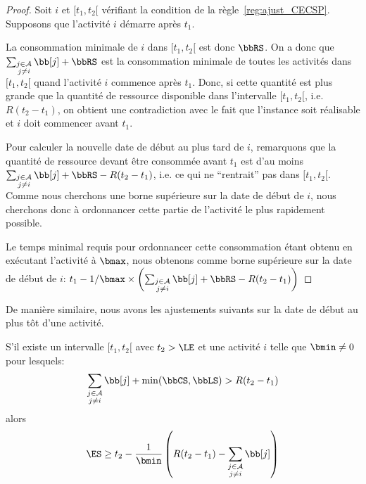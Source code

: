 \begin{proof}
  Soit $i$ et $[t_1,t_2[$ vérifiant la condition de la
  règle~\ref{reg:ajust_CECSP}. Supposons que l'activité $i$ démarre
  après   $t_1$. 

  La consommation minimale de $i$ dans $[t_1,t_2[$ est donc $\bbRS$. On
  a donc que $\sum_{\substack{j \in \A\\ j\neq i}} \bb[j] + \bbRS $ est
  la consommation minimale de toutes les activités dans $[t_1,t_2[$
  quand l'activité $i$ commence après $t_1$. Donc, si cette quantité est
  plus grande que la quantité de ressource disponible dans l'intervalle
  $[t_1,t_2[$, i.e. $R(t_2-t_1)$, on obtient une contradiction avec le
  fait que l'instance soit réalisable et $i$ doit commencer avant
  $t_1$. 

  Pour calculer la nouvelle date de début au plus tard de $i$,
  remarquons que la quantité de ressource devant être consommée avant
  $t_1$ est d'au moins $\sum_{\substack{j \in \A\\ j\neq i}} \bb[j] +
  \bbRS - R(t_2-t_1)$, i.e. ce qui ne ``rentrait'' pas dans
  $[t_1,t_2[$. Comme nous cherchons une borne supérieure sur la date de
  début de $i$, nous cherchons donc à ordonnancer cette partie de
  l'activité le plus rapidement possible. 

  Le temps minimal requis pour ordonnancer cette
  consommation étant obtenu en exécutant l'activité à $\bmax$, nous
  obtenons comme borne supérieure sur la date de début de $i$:
  $t_1 - 1/\bmax \times \left(\sum_{\substack{j \in \A\\ j\neq
        i}} \bb[j] + \bbRS - R(t_2-t_1)\right)$
\end{proof}

De manière similaire, nous avons les ajustements suivants sur la date
de début au plus tôt d'une activité. 
\begin{reg}
  \label{reg:ajustRi_CECSP}
  S'il existe un intervalle $[t_1,t_2[$ avec $ t_2 > \LE$ et une
  activité $i$ telle que $\bmin \neq 0$ pour lesquels:
  \[ \sum_{\substack{j \in \A \\ j \neq i}} \bb[j] +
    \min(\bbCS,\bbLS) > R (t_2-t_1)\] 
  alors
  \[ \ES \ge t_2 - \frac{1}{\bmin} \left(R (t_2-t_1) -\sum_{\substack{j
          \in \A \\ j \neq i}} \bb[j] \right) \]
\end{reg}

